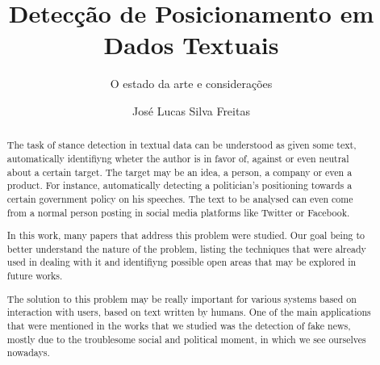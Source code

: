 \documentclass[12pt, sigconf]{acmart}
\begin{document}
\title{Detecção de Posicionamento em Dados Textuais}
\subtitle{O estado da arte e considerações}


\author{José Lucas Silva Freitas}

\renewcommand{\shortauthors}{Lucas Freitas et al.}


\begin{abstract}

\quad  The task of stance detection in textual data can be understood as
given some text, automatically identifiyng wheter the author is in favor of,
against or even neutral about a certain target. The target may be an idea,
a person, a company or even a product. For instance, automatically detecting
a politician's positioning towards a certain government policy
on his speeches. The text to be analysed can even come from a normal person 
posting in social media platforms like Twitter or Facebook.

\quad  In this work, many papers that address this problem were studied. Our goal
being to better understand the nature of the problem, listing the techniques
that were already used in dealing with it and identifiyng possible open
areas that may be explored in future works.

\quad  The solution to this problem may be really important for various systems
based on interaction with users, based on text written by humans. One
of the main applications that were mentioned in the works that we studied
was the detection of fake news, mostly due to the troublesome social and 
political moment, in which we see ourselves nowadays.
\end{abstract}
\maketitle




\end{document}
